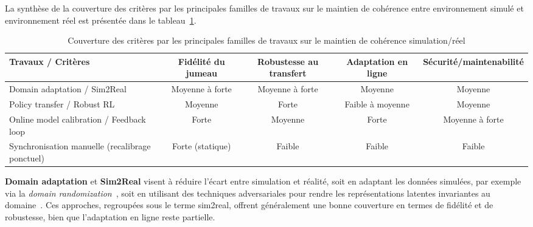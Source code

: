 La synthèse de la couverture des critères par les principales familles de travaux sur le maintien de cohérence entre environnement simulé et environnement réel est présentée dans le tableau~\ref{tab:couverture_criteres_travaux_trf}.

\begin{table}[h!]
  \centering
  \caption{Couverture des critères par les principales familles de travaux sur le maintien de cohérence simulation/réel}
  \label{tab:couverture_criteres_travaux_trf}
  \begin{tabular}{|p{5cm}|c|c|c|c|}
    \hline
    \textbf{Travaux / Critères}                                                       & \textbf{Fidélité du jumeau} & \textbf{Robustesse au transfert} & \textbf{Adaptation en ligne} & \textbf{Sécurité/maintenabilité} \\
    \hline
    Domain adaptation / Sim2Real~\cite{tobin2017domain,ganin2016domain}               & Moyenne à forte             & Moyenne à forte                  & Moyenne                      & Moyenne                          \\
    \hline
    Policy transfer / Robust RL~\cite{pinto2017robust}                                & Moyenne                     & Forte                            & Faible à moyenne             & Moyenne                          \\
    \hline
    Online model calibration / Feedback loop~\cite{deisenroth2011pilco}               & Forte                       & Moyenne                          & Forte                        & Moyenne à forte                  \\
    \hline
    Synchronisation manuelle (recalibrage ponctuel)~\cite{Standen2021,cyberbattlesim} & Forte (statique)            & Faible                           & Faible                       & Faible                           \\
    \hline
  \end{tabular}
\end{table}

\noindent
\textbf{Domain adaptation} et \textbf{Sim2Real} visent à réduire l’écart entre simulation et réalité, soit en adaptant les données simulées, par exemple via la \textit{domain randomization}~\cite{tobin2017domain}, soit en utilisant des techniques adversariales pour rendre les représentations latentes invariantes au domaine~\cite{ganin2016domain}. Ces approches, regroupées sous le terme sim2real, offrent généralement une bonne couverture en termes de fidélité et de robustesse, bien que l’adaptation en ligne reste partielle.

